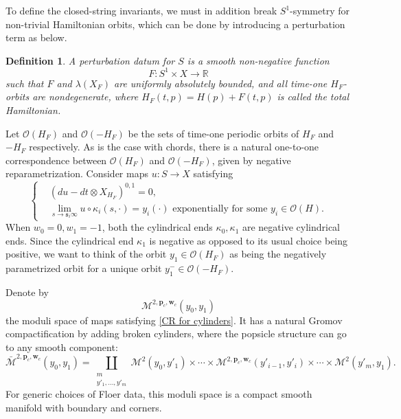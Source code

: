 \documentclass[11pt]{amsproc}
\def\R{{\mathbb R}}
\def\o{\mathcal{O}}
\def\k{\kappa}
\def\M{\mathcal{M}}
\def\sk{\mathfrak{s}}
\newtheorem{defn}[lem]{Definition}
\theoremstyle{remark}
\numberwithin{equation}{section}
\begin{document}
To define the closed-string invariants, we must in addition break $S^{1}$-symmetry for non-trivial Hamiltonian orbits,
which can be done by introducing a perturbation term as below.

\begin{defn}\label{def: perturbation datum on cylinder}
A perturbation datum for $S$ is a smooth non-negative function
\begin{equation}
F: S^{1} \times X \to \R
\end{equation}
such that $F$ and $\lambda(X_{F})$ are uniformly absolutely bounded, 
and all time-one $H_{F}$-orbits are nondegenerate, 
where $H_{F}(t, p) = H(p) + F(t, p)$ is called the total Hamiltonian.
\end{defn}

Let $\o(H_{F})$ and $\o(-H_{F})$ be the sets of time-one periodic orbits of $H_{F}$ and $-H_{F}$ respectively.
As is the case with chords, there is a natural one-to-one correspondence between $\o(H_{F})$ and $\o(-H_{F})$,
given by negative reparametrization.
Consider maps $u: S \to X$ satisfying
\begin{equation}\label{CR for cylinders}
\begin{cases}
&(du - dt \otimes X_{H_{F}})^{0, 1} = 0, \\
&\lim\limits_{s \to \sk_{i}\infty} u \circ \k_{i}(s, \cdot) = y_{i}(\cdot) \text{ exponentially for some } y_{i} \in \o(H). 
\end{cases}
\end{equation}
When $w_{0}=0, w_{1}=-1$, both the cylindrical ends $\k_{0}, \k_{1}$ are negative cylindrical ends.
Since the cylindrical end $\k_{1}$ is negative as opposed to its usual choice being positive,
we want to think of the orbit $y_{1} \in \o(H_{F})$ as being the negatively parametrized orbit for a unique orbit $y_{1}^{-} \in \o(-H_{F})$.

Denote by 
\begin{equation}
\M^{2, \mathbf{p}_{c}, \mathbf{w}_{c}}(y_{0}, y_{1})
\end{equation}
the moduli space of maps satisfying \eqref{CR for cylinders}.
It has a natural Gromov compactification by adding broken cylinders,
where the popsicle structure can go to any smooth component:
\begin{equation}
\bar{\M}^{2, \mathbf{p}_{c}, \mathbf{w}_{c}}(y_{0}, y_{1}) = \coprod_{\substack{m \\ y'_{1}, \ldots, y'_{m}}} \M^{2}(y_{0}, y'_{1}) \times \cdots \times \M^{2, \mathbf{p}_{c}, \mathbf{w}_{c}}(y'_{i-1}, y'_{i}) \times \cdots \times \M^{2}(y'_{m}, y_{1}).
\end{equation}
For generic choices of Floer data, this moduli space is a compact smooth manifold with boundary and corners.
\end{document}

